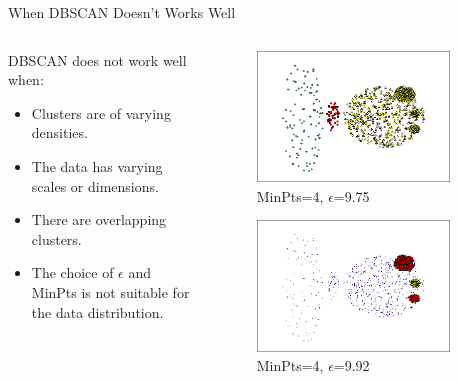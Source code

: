 \begin{frame}[allowframebreaks]{When DBSCAN Doesn't Works Well}
\begin{columns}
\begin{column}{0.5\textwidth}
        DBSCAN does not work well when:
        \begin{itemize}
            \item Clusters are of varying densities.
            \item The data has varying scales or dimensions.
            \item There are overlapping clusters.
            \item The choice of $\epsilon$ and MinPts is not suitable for the data distribution.
        \end{itemize}
    \end{column}
    \begin{column}{0.5\textwidth}
        \begin{figure}
            \centering
            \includegraphics[width=0.9\textwidth,keepaspectratio]{images/dul/dbscan/dbscan-clusters-1.png}
            \caption{MinPts=4, $\epsilon$=9.75}
        \end{figure}
        \begin{figure}
            \centering
            \includegraphics[width=0.9\textwidth,keepaspectratio]{images/dul/dbscan/dbscan-clusters-2.png}
            \caption{MinPts=4, $\epsilon$=9.92}
        \end{figure}
    \end{column}
\end{columns}

\end{frame}

